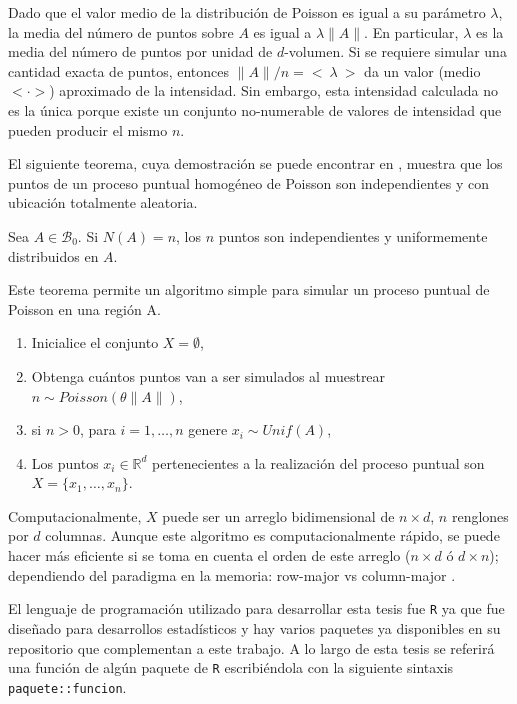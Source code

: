 Dado que el valor medio de la distribuci\'on de Poisson es igual a su par\'ametro $\lambda$, la media del n\'umero de puntos sobre $A$ es igual a $\lambda \|A\|$. En particular, $\lambda$ es la media del n\'umero de puntos por unidad de $d$-volumen. Si se requiere simular una cantidad exacta de puntos, entonces $\|A\| / n = <~\lambda~>$ da un valor (medio $<\cdot>$) aproximado de la intensidad. Sin embargo, esta intensidad calculada no es la \'unica porque existe un conjunto no-numerable de valores de intensidad que pueden producir el mismo $n$.

El siguiente teorema, cuya demostraci\'on se puede encontrar en \cite[p. 121]{lantuejoul_geostatistical_2002}, muestra que los puntos de un proceso puntual homog\'eneo de Poisson son independientes y con ubicaci\'on totalmente aleatoria.

Sea $A \in \mathcal{B}_0$. Si $N(A)=n$, los $n$ puntos son independientes y uniformemente distribuidos en $A$.

Este teorema permite un algoritmo simple para simular un proceso puntual de Poisson en una regi\'on A.

\begin{enumerate}
	\item Inicialice el conjunto $X = \emptyset$,
	\item Obtenga cu\'antos puntos van a ser simulados al muestrear $n \sim Poisson(\theta \|A\|)$,
	\item si $n > 0$, para $i=1, \ldots,n$ genere $x_i \sim Unif(A)$,
	\item Los puntos $x_i \in \mathbb{R}^d$ pertenecientes a la realizaci\'on del proceso puntual son $X=\{x_1, \dots, x_n\}$.
\end{enumerate}

Computacionalmente, $X$ puede ser un arreglo bidimensional de $n \times d$, $n$ renglones por $d$ columnas. Aunque este algoritmo es computacionalmente r\'apido, se puede hacer m\'as eficiente si se toma en cuenta el orden de este arreglo ($n \times d$ \'o $d \times n$); dependiendo del paradigma en la memoria: row-major vs column-major \citep{karniadakis_parallel_2003,matloff_parallel_2016}.

El lenguaje de programaci\'on utilizado para desarrollar esta tesis fue \verb|R| ya que fue dise\~nado para desarrollos estad\'isticos y hay varios paquetes ya disponibles en su repositorio que complementan a este trabajo. A lo largo de esta tesis se referir\'a una funci\'on de alg\'un paquete de \verb|R| escribi\'endola con la siguiente sintaxis \verb|paquete::funcion|.

